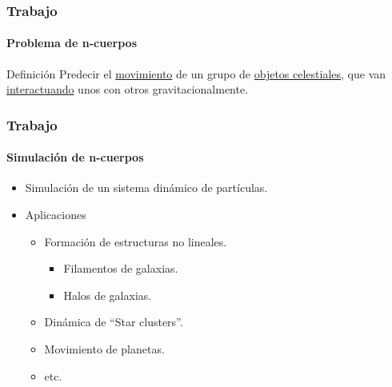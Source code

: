 \frame
{
\frametitle{Trabajo}
\framesubtitle{Problema de n-cuerpos}
\begin{block}{Definición}
    Predecir el \underline{movimiento} de un grupo de \underline{objetos celestiales},
    que van \underline{interactuando} unos con otros gravitacionalmente.
\end{block}
}

\frame
{
\frametitle{Trabajo}
\framesubtitle{Simulación de n-cuerpos}
\begin{itemize}
    \item Simulación de un sistema dinámico de partículas.
    \item Aplicaciones
    \begin{itemize}
        \item Formación de estructuras no lineales.
        \begin{itemize}
            \item Filamentos de galaxias.
            \item Halos de galaxias.
        \end{itemize}
        \item Dinámica de ``Star clusters''.
        \item Movimiento de planetas.
        \item etc.
    \end{itemize}
\end{itemize}
}



